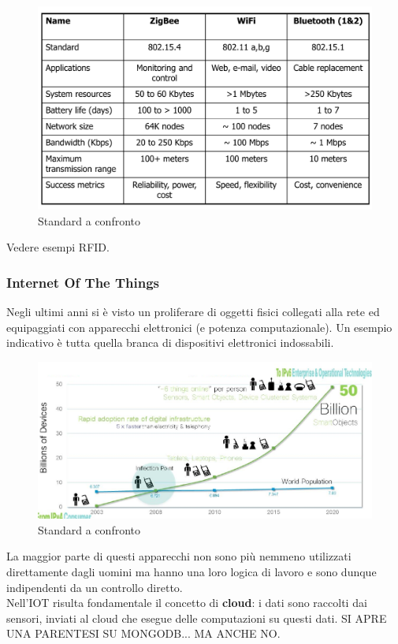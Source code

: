 \documentclass[12pt]{article}
\begin{document}
    		\begin{figure}[h!]
    			\centering
    			\includegraphics[scale=0.3]{img/standard.png}
    			\caption{Standard a confronto}
    		\end{figure}
    		Vedere esempi RFID.
    	\subsubsection{Internet Of The Things}
    		Negli ultimi anni si è visto un proliferare di oggetti fisici collegati alla rete ed equipaggiati con apparecchi elettronici (e potenza computazionale). Un esempio indicativo è tutta quella branca di dispositivi elettronici indossabili.
    		\begin{figure}[h!]
    			\centering
    			\includegraphics[scale=0.3]{img/time.png}
    			\caption{Standard a confronto}
    		\end{figure}
    		La maggior parte di questi apparecchi non sono più nemmeno utilizzati direttamente dagli uomini ma hanno una loro logica di lavoro e sono dunque indipendenti da un controllo diretto.\\
    		Nell'IOT risulta fondamentale il concetto di \textbf{cloud}: i dati sono raccolti dai sensori, inviati al cloud che esegue delle computazioni su questi dati.   
    		SI APRE UNA PARENTESI SU MONGODB... MA ANCHE NO.
\end{document}
